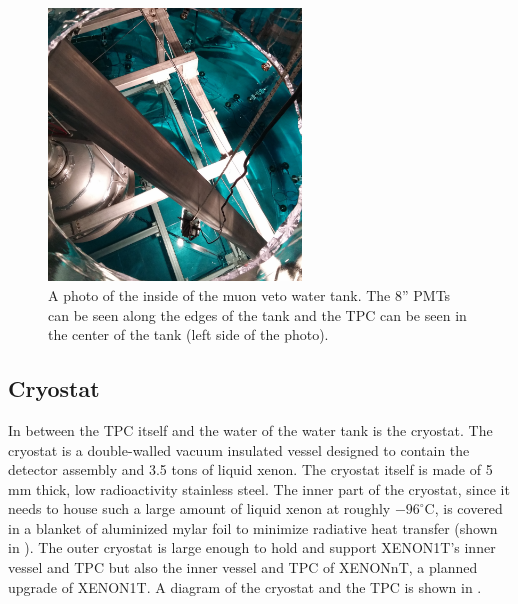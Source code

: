  
 \begin{figure}[t]
	\centering
	\includegraphics[width=0.6\textwidth]{water_tank_filling}
	\caption{A photo of the inside of the muon veto water tank.  The 8'' PMTs can be seen along the edges of the tank and the TPC can be seen in the center of the tank (left side of the photo).}
	\label{fig:photo_water_tank}
\end{figure}



 \subsection{Cryostat}
 \label{sec:cryostat}


In between the TPC itself and the water of the water tank is the cryostat.  The cryostat is a double-walled vacuum insulated vessel designed to contain the detector assembly and 3.5 tons of liquid xenon.  The cryostat itself is made of 5 mm thick, low radioactivity stainless steel.  The inner part of the cryostat, since it needs to house such a large amount of liquid xenon at roughly $-96^{\circ}$C, is covered in a blanket of aluminized mylar foil to minimize radiative heat transfer (shown in ).  The outer cryostat is large enough to hold and support  XENON1T's inner vessel and TPC but also the inner vessel and TPC of XENONnT, a planned upgrade of XENON1T.  A diagram of the cryostat and the TPC is shown in .

